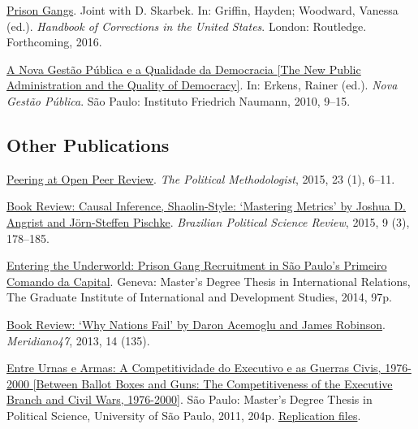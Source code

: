 \documentclass[letterpaper]{article}
\renewenvironment{itemize}{
  \begin{list}{}{
    \setlength{\leftmargin}{1.5em}
  }
}{
  \end{list}
}
\begin{document}
\begin{itemize}
	\item \href{http://danilofreire.com/articles/chapter-prison-gangs.pdf}{Prison Gangs}. Joint with D. Skarbek. In: Griffin, Hayden; Woodward, Vanessa (ed.). \textit{Handbook of Corrections in the United States}. London: Routledge. Forthcoming, 2016.
	\item \href{http://ffn-brasil.org.br/novo/PDF-ex/Publicacoes/NGP.pdf}{A Nova Gest\~{a}o P\'{u}blica e a Qualidade da Democracia {[}The New Public Administration and the Quality of Democracy{]}}. In: Erkens, Rainer (ed.). \textit{Nova Gest\~{a}o P\'{u}blica}. S\~{a}o Paulo: Instituto Friedrich Naumann, 2010, 9--15.
\end{itemize}

\subsection*{Other Publications}

\begin{itemize}
	\item \href{https://thepoliticalmethodologist.files.wordpress.com/2016/02/tpm_v23_n1.pdf}{Peering at Open Peer Review}. \textit{The Political Methodologist}, 2015, 23 (1), 6--11.
	\item \href{http://www.scielo.br/readcube/epdf.php?doi=10.1590/1981-38212015000300026&pid=S1981-38212015000300178&pdf_path=bpsr/v9n3/1981-3821-bpsr-9-3-0178.pdf&lang=en}{Book Review: Causal Inference, Shaolin-Style: `Mastering Metrics' by Joshua D. Angrist and J\"{o}rn-Steffen Pischke}. \textit{Brazilian Political Science Review}, 2015, 9 (3), 178--185.
	\item \href{http://dx.doi.org/10.6084/m9.figshare.1209203}{Entering the Underworld: Prison Gang Recruitment in S\~{a}o Paulo's Primeiro Comando da Capital}. Geneva: Master's Degree Thesis in International Relations, The Graduate Institute of International and Development Studies, 2014, 97p.
	\item \href{http://seer.bce.unb.br/index.php/MED/article/view/7505/6497}{Book Review: `Why Nations Fail' by Daron Acemoglu and James Robinson}. \textit{Meridiano47}, 2013, 14 (135).
	\item \href{http://dx.doi.org/10.6084/m9.figshare.963082}{Entre Urnas e Armas: A Competitividade do Executivo e as Guerras Civis, 1976-2000 {[}Between Ballot Boxes and Guns: The Competitiveness of the Executive Branch and Civil Wars, 1976-2000{]}}. S\~{a}o Paulo: Master's Degree Thesis in Political Science, University of S\~{a}o Paulo, 2011, 204p. \href{http://dx.doi.org/10.6084/m9.figshare.963183}{Replication files}.
\end{itemize}
\end{document}
